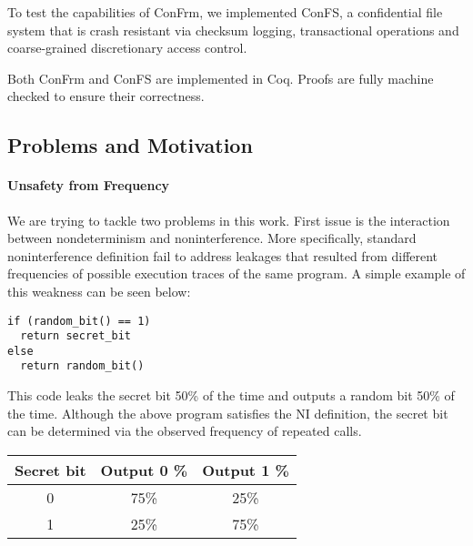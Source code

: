 \documentclass[onecolumn]{paper}
\begin{document}
To test the capabilities of ConFrm, we implemented ConFS, a confidential file system that is crash resistant via checksum logging, transactional operations and coarse-grained discretionary access control. 

Both ConFrm and ConFS are implemented in Coq. Proofs are fully machine checked to ensure their correctness. 





\subsection*{Problems and Motivation}
\paragraph{Unsafety from Frequency}
We are trying to tackle two problems in this work. First issue is the interaction between nondeterminism and noninterference. More specifically, standard noninterference definition fail to address leakages that resulted from different frequencies of possible execution traces of the same program. A simple example of this weakness can be seen below: 


\begin{lstlisting}
if (random_bit() == 1)
  return secret_bit
else
  return random_bit()
\end{lstlisting}

This code leaks the secret bit 50\% of the time and outputs a random bit 50\% of the time. Although the above program satisfies the NI definition, the secret bit can be determined via the observed frequency of repeated calls. \\


\begin{tabular}{| c | c | c |}
	\hline
	Secret bit & Output 0 \% & Output 1 \% \\
	\hline
	0 &	75\% & 25\% \\
	\hline
	1 &	25\% & 75\% \\
	\hline
\end{tabular}\\
 
\end{document}
